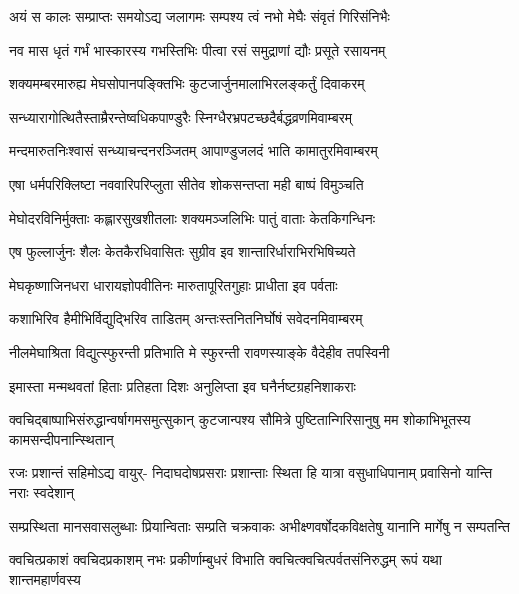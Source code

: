 \twolineshloka
{अयं स कालः सम्प्राप्तः समयोऽद्य जलागमः}
{सम्पश्य त्वं नभो मेघैः संवृतं गिरिसंनिभैः} %

\twolineshloka
{नव मास धृतं गर्भं भास्कारस्य गभस्तिभिः}
{पीत्वा रसं समुद्राणां द्यौः प्रसूते रसायनम्} %

\twolineshloka
{शक्यमम्बरमारुह्य मेघसोपानपङ्क्तिभिः}
{कुटजार्जुनमालाभिरलङ्कर्तुं दिवाकरम्} %

\twolineshloka
{सन्ध्यारागोत्थितैस्ताम्रैरन्तेष्वधिकपाण्डुरैः}
{स्निग्धैरभ्रपटच्छदैर्बद्धव्रणमिवाम्बरम्} %

\twolineshloka
{मन्दमारुतनिःश्वासं सन्ध्याचन्दनरञ्जितम्}
{आपाण्डुजलदं भाति कामातुरमिवाम्बरम्} %

\twolineshloka
{एषा धर्मपरिक्लिष्टा नववारिपरिप्लुता}
{सीतेव शोकसन्तप्ता मही बाष्पं विमुञ्चति} %

\twolineshloka
{मेघोदरविनिर्मुक्ताः कह्लारसुखशीतलाः}
{शक्यमञ्जलिभिः पातुं वाताः केतकिगन्धिनः} %

\twolineshloka
{एष फुल्लार्जुनः शैलः केतकैरधिवासितः}
{सुग्रीव इव शान्तारिर्धाराभिरभिषिच्यते} %

\twolineshloka
{मेघकृष्णाजिनधरा धारायज्ञोपवीतिनः}
{मारुतापूरितगुहाः प्राधीता इव पर्वताः} %

\twolineshloka
{कशाभिरिव हैमीभिर्विद्युद्भिरिव ताडितम्}
{अन्तःस्तनितनिर्घोषं सवेदनमिवाम्बरम्} %

\twolineshloka
{नीलमेघाश्रिता विद्युत्स्फुरन्ती प्रतिभाति मे}
{स्फुरन्ती रावणस्याङ्के वैदेहीव तपस्विनी} %

\twolineshloka
{इमास्ता मन्मथवतां हिताः प्रतिहता दिशः}
{अनुलिप्ता इव घनैर्नष्टग्रहनिशाकराः} %

\threelineshloka
{क्वचिद्बाष्पाभिसंरुद्धान्वर्षागमसमुत्सुकान्}
{कुटजान्पश्य सौमित्रे पुष्टितान्गिरिसानुषु}
{मम शोकाभिभूतस्य कामसन्दीपनान्स्थितान्} %

\fourlineindentedshloka
{रजः प्रशान्तं सहिमोऽद्य वायुर्-}
{निदाघदोषप्रसराः प्रशान्ताः}
{स्थिता हि यात्रा वसुधाधिपानाम्}
{प्रवासिनो यान्ति नराः स्वदेशान्} %

\fourlineindentedshloka
{सम्प्रस्थिता मानसवासलुब्धाः}
{प्रियान्विताः सम्प्रति चक्रवाकः}
{अभीक्ष्णवर्षोदकविक्षतेषु}
{यानानि मार्गेषु न सम्पतन्ति} %

\fourlineindentedshloka
{क्वचित्प्रकाशं क्वचिदप्रकाशम्}
{नभः प्रकीर्णाम्बुधरं विभाति}
{क्वचित्क्वचित्पर्वतसंनिरुद्धम्}
{रूपं यथा शान्तमहार्णवस्य} %

